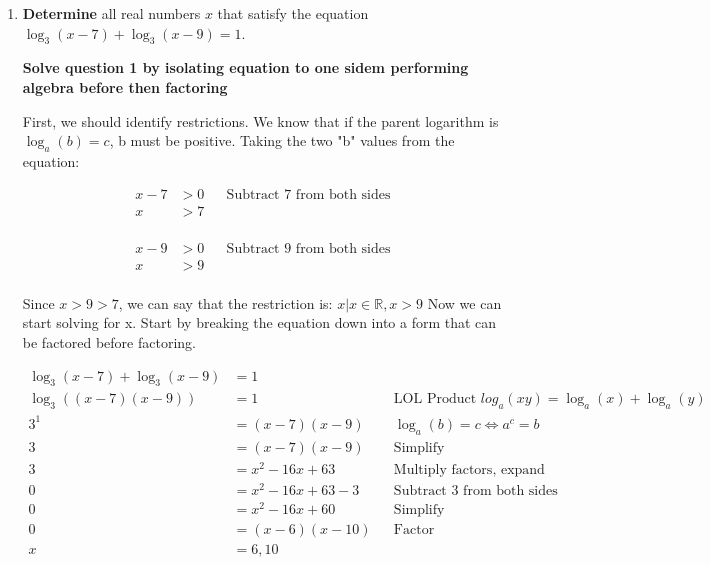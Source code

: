 \documentclass[12pt]{book}
\begin{document}
\begin{enumerate}

\item \textbf{Determine} all real numbers $x$ that satisfy the equation $\log_3(x-7) + \log_3(x-9) = 1$.

\vspace{0.5cm}
\textbf{Solve question 1 by isolating equation to one sidem performing algebra before then factoring}

\vspace{0.2cm}
First, we should identify restrictions. We know that if the parent 
logarithm is $\log_a(b) = c$, b must be positive. Taking the two "b" values 
from the equation:

\vspace{-0.2cm}
\begin{align*}
    x-7 &> 0 && \text{Subtract 7 from both sides}\\
    x &> 7 \\
\end{align*}

\vspace{-1.5cm}
\begin{align*}
    x-9 &> 0 && \text{Subtract 9 from both sides}\\
    x &> 9 \\
\end{align*}
\vspace{-0.7cm}

Since $x > 9 > 7$, we can say that the restriction is: ${x| x \in \mathbb{R}, x > 9}$
Now we can start solving for x. Start by breaking the equation down into a form 
that can be factored before factoring.

\addtolength{\jot}{1em}
\begin{align*}
    \log_3(x-7) + \log_3(x-9) &= 1 \\
    \log_3((x-7)(x-9)) &= 1 && \text{LOL Product } log_a(xy) = \log_a(x) + \log_a(y)\\
    3^1 &= (x-7)(x-9) && \log_a(b) = c \Longleftrightarrow a^c = b\\
    3 &= (x-7)(x-9) && \text{Simplify}\\
    3 &= x^2-16x+63 && \text{Multiply factors, expand}\\
    0 &= x^2-16x+63-3 && \text{Subtract 3 from both sides}\\
    0 &= x^2-16x+60 && \text{Simplify}\\
    0 &= (x-6)(x-10) && \text{Factor}\\
    x &= 6, 10 \\
\end{align*}


\end{enumerate}
\end{document}
